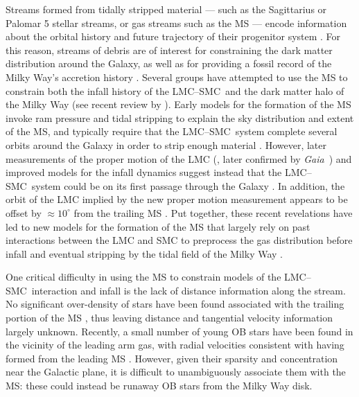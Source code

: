 \documentclass[modern]{aastex62}
\newcommand{\gaia}{\textsl{Gaia}}
\newcommand{\lmcsmc}{LMC--SMC}
\begin{document}
Streams formed from tidally stripped material --- such as the Sagittarius or Palomar 5 \citep{Odenkirchen:2001} stellar streams, or gas streams such as the MS --- encode information about the orbital history and future trajectory of their progenitor system \citep[e.g.,][]{Johnston:1999}.
For this reason, streams of debris are of interest for constraining the dark matter distribution around the Galaxy, as well as for providing a fossil record of the Milky Way's accretion history \citep{Johnston:1998, Bullock:2005}.
Several groups have attempted to use the MS to constrain both the infall history of the \lmcsmc\ and the dark matter halo of the Milky Way (see recent review by \citealt{DOnghia:2016}).
Early models for the formation of the MS invoke ram pressure and tidal stripping to explain the sky distribution and extent of the MS, and typically require that the \lmcsmc\ system complete several orbits around the Galaxy in order to strip enough material \citep[e.g.,][]{Murai:1980, Gardiner:1994, Mastropietro:2005}.
However, later measurements of the proper motion of the LMC (\citealt{Kallivayalil:2006}, later confirmed by \gaia\ \citealt{van-der-Marel:2016}) and improved models for the infall dynamics \citep{Besla:2007} suggest instead that the \lmcsmc\ system could be on its first passage through the Galaxy \citep{Besla:2010, Besla:2012}.
In addition, the orbit of the LMC implied by the new proper motion measurement appears to be offset by $\approx 10^\circ$ from the trailing MS \citep{Besla:2010}.
Put together, these recent revelations have led to new models for the formation of the MS that largely rely on past interactions between the LMC and SMC to preprocess the gas distribution before infall and eventual stripping by the tidal field of the Milky Way \citep{Besla:2012, Diaz:2012}.

One critical difficulty in using the MS to constrain models of the \lmcsmc\ interaction and infall is the lack of distance information along the stream.
No significant over-density of stars have been found associated with the trailing portion of the MS \citep{Guhathakurta:1998}, thus leaving distance and tangential velocity information largely unknown.
Recently, a small number of young OB stars have been found in the vicinity of the leading arm gas, with radial velocities consistent with having formed from the leading MS \citep{Casetti-Dinescu:2014, Zhang:2017}.
However, given their sparsity and concentration near the Galactic plane, it is difficult to unambiguously associate them with the MS: these could instead be runaway OB stars from the Milky Way disk.
\end{document}
